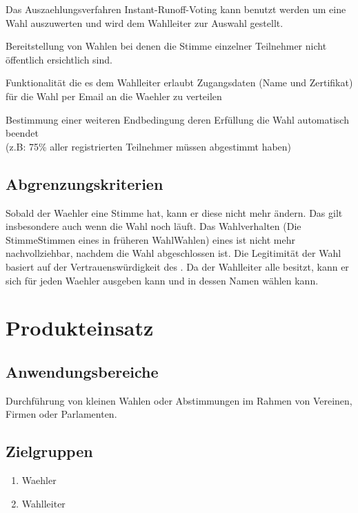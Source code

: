 \documentclass[parskip=full,11pt,twoside]{scrartcl}
\begin{document}
Das \gls{Auszaehlungsverfahren} \gls{Instant-Runoff-Voting} kann benutzt werden um eine Wahl auszuwerten und wird dem \gls{Wahlleiter} zur Auswahl gestellt.

Bereitstellung von Wahlen bei denen die Stimme einzelner Teilnehmer nicht öffentlich ersichtlich sind.

Funktionalität die es dem \gls{Wahlleiter} erlaubt Zugangsdaten (Name und \gls{Zertifikat}) für die \gls{Wahl} per Email an die \gls{Waehler} zu verteilen

Bestimmung einer weiteren Endbedingung deren Erfüllung die \gls{Wahl} automatisch beendet \\(z.B: 75\% aller registrierten Teilnehmer müssen abgestimmt haben)

\subsection{Abgrenzungskriterien}
Sobald der \gls{Waehler} eine Stimme  hat, kann er diese nicht mehr ändern. Das gilt insbesondere auch wenn die \gls{Wahl} noch läuft.
Das Wahlverhalten (Die \gls{Stimme}{Stimmen} eines  in früheren \gls{Wahl}{Wahlen}) eines  ist nicht mehr nachvollziehbar, nachdem die \gls{Wahl} abgeschlossen ist.
Die Legitimität der \gls{Wahl} basiert auf der Vertrauenswürdigkeit des . Da der \gls{Wahlleiter} alle  besitzt, kann er sich für jeden \gls{Waehler} ausgeben kann und in dessen Namen wählen kann.
\section{Produkteinsatz}

\subsection{Anwendungsbereiche}
Durchführung von kleinen Wahlen oder Abstimmungen im Rahmen von Vereinen, Firmen oder Parlamenten.

\subsection{Zielgruppen}
\begin{enumerate}
  \item \gls{Waehler}
  \item \gls{Wahlleiter}
\end{enumerate}
\end{document}
